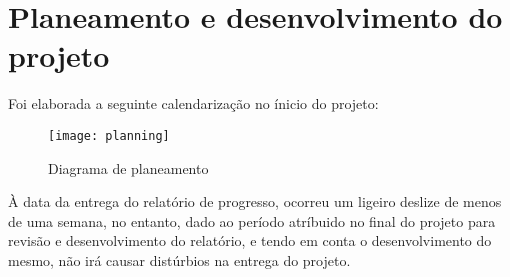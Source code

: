 \section{Planeamento e desenvolvimento do projeto} 
Foi elaborada a seguinte calendarização no ínicio do projeto:

\begin{figure}[h]
	\centering
	\texttt{[image: planning]}
	\caption{Diagrama de planeamento}
\end{figure}

À data da entrega do relatório de progresso, ocorreu um ligeiro deslize de menos de uma semana, no entanto, dado ao período atríbuido no final do projeto para revisão e desenvolvimento do relatório, e tendo em conta o desenvolvimento do mesmo, não irá causar distúrbios na entrega do projeto.